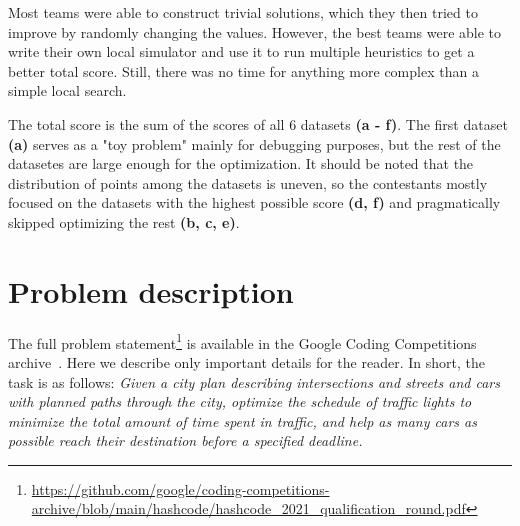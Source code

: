 
Most teams were able to construct trivial solutions, which they then tried to improve by randomly changing the values. However, the best teams were able to write their own local simulator and use it to run multiple heuristics to get a better total score. Still, there was no time for anything more complex than a simple local search.


The total score is the sum of the scores of all 6 datasets \textbf{(a - f)}. The first dataset \textbf{(a)} serves as a "toy problem" mainly for debugging purposes, but the rest of the datasetes are large enough for the optimization. It should be noted that the distribution of points among the datasets is uneven, so the contestants mostly focused on the datasets with the highest possible score \textbf{(d, f)} and pragmatically skipped optimizing the rest \textbf{(b, c, e)}.

\section{Problem description}


The full problem statement\footnote{\url{https://github.com/google/coding-competitions-archive/blob/main/hashcode/hashcode_2021_qualification_round.pdf}} is available in the Google Coding Competitions archive~\cite{google_coding_competitions}. Here we describe only important details for the reader.
In short, the task is as follows: \textit{Given a city plan describing intersections and streets and cars with planned paths through the city, optimize the schedule of traffic lights to minimize the total amount of time spent in traffic, and help as many cars as possible reach their destination before a specified deadline.}

